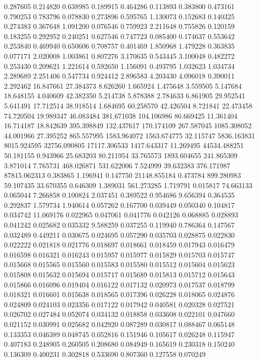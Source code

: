 0.287605
0.214820
0.638985
0.189915
0.464286
0.113893
0.383800
0.473161
0.790253
0.783796
0.078830
0.273896
0.595765
1.130073
0.152683
0.140325
0.274383
0.367648
1.091200
0.076546
0.759923
2.211648
0.755826
0.120159
0.183255
0.292952
0.240251
0.627546
0.747723
0.085400
0.174637
0.553642
0.253840
0.469940
0.650606
0.708757
0.401469
1.850968
1.479228
0.363835
0.077171
2.020008
1.003861
0.807276
3.170635
0.543445
3.100048
0.482272
0.253430
0.209621
1.221614
0.592650
1.156091
0.493795
1.032623
1.034734
2.289689
2.251406
0.547734
0.924412
2.896583
4.203430
4.096018
0.390011
2.292462
16.847661
27.384373
8.626260
1.665924
1.475648
3.559505
5.147684
18.648155
4.040609
42.382350
5.214738
5.878388
2.784633
6.861905
29.952541
5.641491
17.712514
38.918514
1.684695
60.258570
42.426504
8.721841
22.473458
74.720504
19.989347
46.083484
381.671038
104.106986
86.669425
11.361404
16.714187
18.842639
395.398849
132.437617
170.174109
267.587045
1085.308052
44.001966
27.395252
865.557995
1583.964072
1563.674775
32.115747
5836.163831
8015.924595
32756.090805
17117.306533
1417.643317
11.269495
44534.488251
50.181155
0.943966
25.683203
80.211954
33.765573
1893.604655
241.865309
3.871014
7.765731
468.026871
531.622006
7.524999
39.632383
376.171987
87815.062313
0.383865
1.196941
0.147750
21148.855184
0.473784
899.280983
59.107435
33.670355
0.646309
1.389031
561.273285
1.719791
0.015817
74.663133
0.065044
7.266858
0.100824
2.037451
0.389522
0.954686
9.656394
0.364535
0.292837
1.579734
1.940614
0.057262
0.167700
0.039449
0.050340
0.104817
0.034742
11.069176
0.022965
0.047061
0.041776
0.042126
0.068885
0.028893
0.041242
0.025682
0.035332
9.588259
0.037255
0.119940
0.786364
0.147567
0.032489
0.449211
0.030675
0.024695
0.057290
0.035703
0.028875
0.022830
0.022222
0.021818
0.021776
0.018697
0.018661
0.018459
0.017943
0.016479
0.016598
0.016321
0.016243
0.015957
0.015977
0.015829
0.015703
0.015747
0.015668
0.015565
0.015560
0.015583
0.015580
0.015512
0.015604
0.015623
0.015808
0.015632
0.015694
0.015717
0.015689
0.015813
0.015712
0.015643
0.015866
0.016096
0.019404
0.016122
0.017132
0.020973
0.017537
0.018799
0.018321
0.016601
0.015638
0.018565
0.017396
0.026228
0.018065
0.024876
0.024809
0.024103
0.023356
0.017122
0.017942
0.040581
0.020328
0.027521
0.026702
0.027484
0.052074
0.034132
0.018858
0.033608
0.022101
0.047660
0.021152
0.030991
0.025682
0.042920
0.087289
0.030817
0.088467
0.065148
0.133353
0.046389
0.048745
0.052816
0.151946
0.105617
0.026248
0.115947
0.407183
0.248905
0.260505
0.208680
0.084949
0.165619
0.230318
0.150240
0.136309
0.400231
0.302818
0.533690
0.807360
0.127558
0.070249
